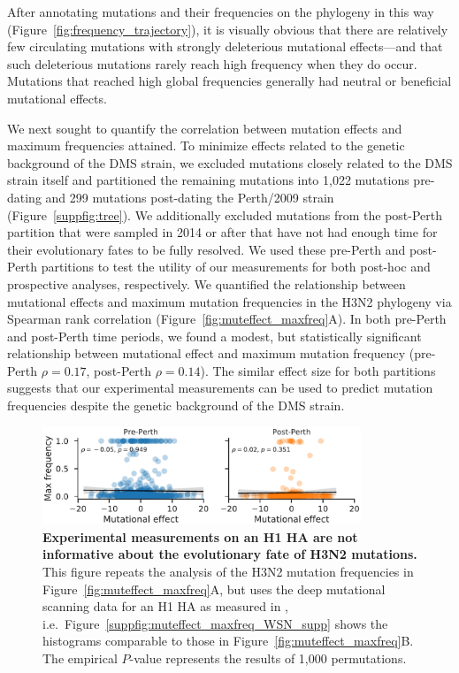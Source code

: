 \documentclass[9pt,twocolumn,twoside]{pnas-new}
\begin{document}
After annotating mutations and their frequencies on the phylogeny in this way (Figure~\ref{fig:frequency_trajectory}), it is visually obvious that there are relatively few circulating mutations with strongly deleterious mutational effects---and that such deleterious mutations rarely reach high frequency when they do occur.
Mutations that reached high global frequencies generally had neutral or beneficial mutational effects.

We next sought to quantify the correlation between mutation effects and maximum frequencies attained.
To minimize effects related to the genetic background of the DMS strain, we excluded mutations closely related to the DMS strain itself and partitioned the remaining mutations into 1,022 mutations pre-dating and 299 mutations post-dating the Perth/2009 strain (Figure~\ref{suppfig:tree}).
We additionally excluded mutations from the post-Perth partition that were sampled in 2014 or after that have not had enough time for their evolutionary fates to be fully resolved.
We used these pre-Perth and post-Perth partitions to test the utility of our measurements for both post-hoc and prospective analyses, respectively.
We quantified the relationship between mutational effects and maximum mutation frequencies in the H3N2 phylogeny via Spearman rank correlation (Figure~\ref{fig:muteffect_maxfreq}A).
In both pre-Perth and post-Perth time periods, we found a modest, but statistically significant relationship between mutational effect and maximum mutation frequency (pre-Perth $\rho = 0.17$, post-Perth $\rho = 0.14$).
The similar effect size for both partitions suggests that our experimental measurements can be used to predict mutation frequencies despite the genetic background of the DMS strain.

\begin{figure}[ht]
\centering
\includegraphics[width=0.85\textwidth]{figs/muteffect_by_maxfreq_WSN_1.pdf}
\caption{\label{fig:muteffect_maxfreq_WSN}
{\bf Experimental measurements on an H1 HA are not informative about the evolutionary fate of H3N2 mutations.}
This figure repeats the analysis of the H3N2 mutation frequencies in Figure~\ref{fig:muteffect_maxfreq}A, but uses the deep mutational scanning data for an H1 HA as measured in \cite{doud2016accurate}, i.e.\
Figure~\ref{suppfig:muteffect_maxfreq_WSN_supp} shows the histograms comparable to those in Figure~\ref{fig:muteffect_maxfreq}B.
The empirical $P$-value represents the results of 1,000 permutations.
}
\end{figure}
\end{document}
